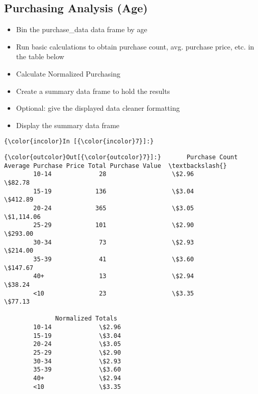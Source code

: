 \documentclass[11pt]{article}
\begin{document}
    \subsection{Purchasing Analysis (Age)}\label{purchasing-analysis-age}

    \begin{itemize}
\item
  Bin the purchase\_data data frame by age
\item
  Run basic calculations to obtain purchase count, avg. purchase price,
  etc. in the table below
\item
  Calculate Normalized Purchasing
\item
  Create a summary data frame to hold the results
\item
  Optional: give the displayed data cleaner formatting
\item
  Display the summary data frame
\end{itemize}

    \begin{Verbatim}[commandchars=\\\{\}]
{\color{incolor}In [{\color{incolor}7}]:} 
\end{Verbatim}


\begin{Verbatim}[commandchars=\\\{\}]
{\color{outcolor}Out[{\color{outcolor}7}]:}       Purchase Count Average Purchase Price Total Purchase Value  \textbackslash{}
        10-14             28                  \$2.96               \$82.78   
        15-19            136                  \$3.04              \$412.89   
        20-24            365                  \$3.05            \$1,114.06   
        25-29            101                  \$2.90              \$293.00   
        30-34             73                  \$2.93              \$214.00   
        35-39             41                  \$3.60              \$147.67   
        40+               13                  \$2.94               \$38.24   
        <10               23                  \$3.35               \$77.13   
        
              Normalized Totals  
        10-14             \$2.96  
        15-19             \$3.04  
        20-24             \$3.05  
        25-29             \$2.90  
        30-34             \$2.93  
        35-39             \$3.60  
        40+               \$2.94  
        <10               \$3.35  
\end{Verbatim}
            
\end{document}
